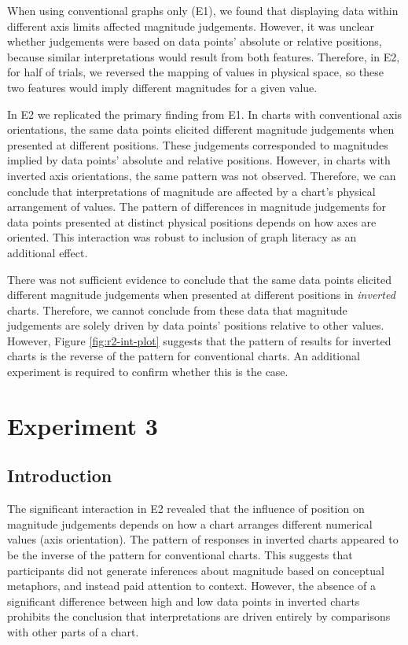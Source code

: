 \documentclass[journal]{vgtc}                %
\begin{document}
When using conventional graphs only (E1), we found that displaying data within different axis limits affected magnitude judgements. However, it was unclear whether judgements were based on data points' absolute or relative positions, because similar interpretations would result from both features. Therefore, in E2, for half of trials, we reversed the mapping of values in physical space, so these two features would imply different magnitudes for a given value.

In E2 we replicated the primary finding from E1. In charts with conventional axis orientations, the same data points elicited different magnitude judgements when presented at different positions. These judgements corresponded to magnitudes implied by data points' absolute and relative positions. However, in charts with inverted axis orientations, the same pattern was not observed. Therefore, we can conclude that interpretations of magnitude are affected by a chart's physical arrangement of values. The pattern of differences in magnitude judgements for data points presented at distinct physical positions depends on how axes are oriented. This interaction was robust to inclusion of graph literacy as an additional effect.

There was not sufficient evidence to conclude that the same data points elicited different magnitude judgements when presented at different positions in \emph{inverted} charts. Therefore, we cannot conclude from these data that magnitude judgements are solely driven by data points' positions relative to other values. However, Figure \ref{fig:r2-int-plot} suggests that the pattern of results for inverted charts is the reverse of the pattern for conventional charts. An additional experiment is required to confirm whether this is the case.

\hypertarget{experiment-3}{%
\section{Experiment 3}\label{experiment-3}}

\hypertarget{introduction-3}{%
\subsection{Introduction}\label{introduction-3}}

The significant interaction in E2 revealed that the influence of position on magnitude judgements depends on how a chart arranges different numerical values (axis orientation). The pattern of responses in inverted charts appeared to be the inverse of the pattern for conventional charts. This suggests that participants did not generate inferences about magnitude based on conceptual metaphors, and instead paid attention to context. However, the absence of a significant difference between high and low data points in inverted charts prohibits the conclusion that interpretations are driven entirely by comparisons with other parts of a chart.
\end{document}
